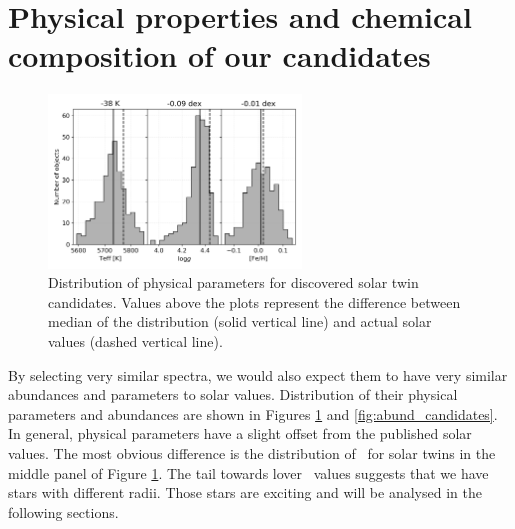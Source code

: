 \section{Physical properties and chemical composition of our candidates}
\label{sec:05_chem_compos}

\begin{figure}
	\centering
	\includegraphics[width=0.6\textwidth]{solar_twins_like_07_ebv_c3.png}
	\caption{Distribution of physical parameters \protect\cite{buder2020} for discovered solar twin candidates. Values above the plots represent the difference between median of the distribution (solid vertical line) and actual solar values (dashed vertical line).}
	\label{fig:twins_stats}
\end{figure}

By selecting very similar spectra, we would also expect them to have very similar abundances and parameters to solar values. Distribution of their physical parameters and abundances are shown in Figures \ref{fig:twins_stats} and \ref{fig:abund_candidates}. In general, physical parameters have a slight offset from the published solar values. The most obvious difference is the distribution of \Logg\ for solar twins in the middle panel of Figure \ref{fig:twins_stats}. The tail towards lover \Logg\ values suggests that we have stars with different radii. Those stars are exciting and will be analysed in the following sections.

